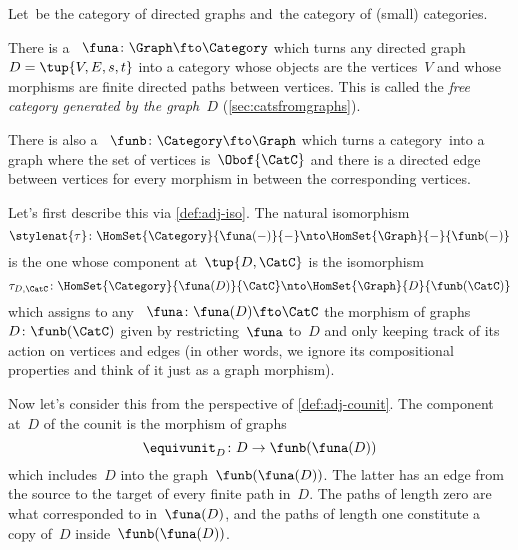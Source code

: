 \begin{example}
    Let~\Graph be the category of directed graphs and~\Category the category of (small) categories.

    There is a ~$\funa \colon \Graph \fto \Category$ which turns any directed graph~$D = \tup{V,E, s,t}$ into a category whose objects are the vertices~$V$ and whose morphisms are finite directed paths between vertices.
    This is called the \emph{free category generated by the graph~$D$} (\cref{sec:catsfromgraphs}).

    There is also a ~$\funb \colon \Category \fto \Graph$ which turns a category~\CatC into a graph where the set of vertices is~$\Obof{\CatC}$ and there is a directed edge between vertices for every morphism in \CatC between the corresponding vertices.

    Let's first describe this  via \cref{def:adj-iso}.
    The natural isomorphism
    \begin{equation}\label{eq:cat-graph-adjunction-transpose-iso}
        \stylenat{\tau}\colon \HomSet{\Category}{\funa(-)}{-} \nto \HomSet{\Graph}{-}{\funb(-)}
    \end{equation}
    is the one whose component at~$\tup{D,\CatC}$ is the isomorphism
    \begin{equation}\label{eq:cat-graph-adjunction-transpose-iso-components}
        \tau_{D,\CatC} \colon \HomSet{\Category}{\funa(D)}{\CatC} \nto \HomSet{\Graph}{D}{\funb(\CatC)}
    \end{equation}
    which assigns to any ~$\funa\colon \funa(D) \fto \CatC$ the morphism of graphs~$D \colon \funb(\CatC)$ given by restricting~$\funa$ to~$D$ and only keeping track of its action on vertices and edges (in other words, we ignore its compositional properties and think of it just as a graph morphism).

    Now let's consider this  from the perspective of \cref{def:adj-counit}.
    The component at~$D$ of the counit is the morphism of graphs
    \begin{equation}\label{eq:cat-graph-adjunction-unit}
        \equivunit_D \colon D \to \funb(\funa(D))
    \end{equation}
    which includes~$D$ into the graph~$\funb(\funa(D))$.
    The latter has an edge from the source to the target of every finite path in~$D$.
    The paths of length zero are what corresponded to  in~$\funa(D)$, and the paths of length one constitute a copy of~$D$ inside~$\funb(\funa(D))$.


\end{example}
